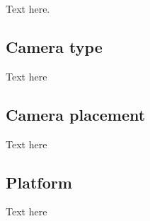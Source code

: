 Text here.


\subsection{Camera type}
Text here

\subsection{Camera placement}
Text here

\subsection{Platform}
Text here


